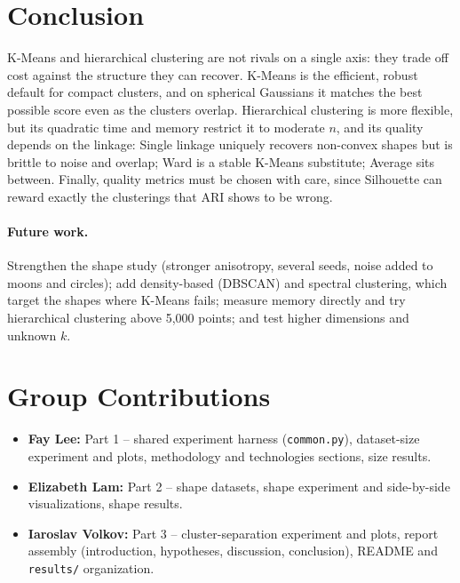 \documentclass[11pt,letterpaper]{article}
\begin{document}
\section{Conclusion}

K-Means and hierarchical clustering are not rivals on a single axis: they
trade off cost against the structure they can recover. K-Means is the
efficient, robust default for compact clusters, and on spherical Gaussians
it matches the best possible score even as the clusters overlap. Hierarchical
clustering is more flexible, but its quadratic time and memory restrict it to
moderate $n$, and its quality depends on the linkage: Single linkage uniquely
recovers non-convex shapes but is brittle to noise and overlap; Ward is a
stable K-Means substitute; Average sits between. Finally, quality metrics must
be chosen with care, since Silhouette can reward exactly the clusterings that
ARI shows to be wrong.

\paragraph{Future work.} Strengthen the shape study (stronger anisotropy,
several seeds, noise added to moons and circles); add density-based
(DBSCAN) and spectral clustering, which target the shapes where K-Means
fails; measure memory directly and try hierarchical clustering above
5{,}000 points; and test higher dimensions and unknown $k$.

\section*{Group Contributions}

\begin{itemize}
    \item \textbf{Fay Lee:} Part 1 -- shared experiment harness
    (\texttt{common.py}), dataset-size experiment and plots, methodology and
    technologies sections, size results.
    \item \textbf{Elizabeth Lam:} Part 2 -- shape datasets, shape experiment
    and side-by-side visualizations, shape results.
    \item \textbf{Iaroslav Volkov:} Part 3 -- cluster-separation experiment
    and plots, report assembly (introduction, hypotheses, discussion,
    conclusion), README and \texttt{results/} organization.
\end{itemize}
\end{document}
